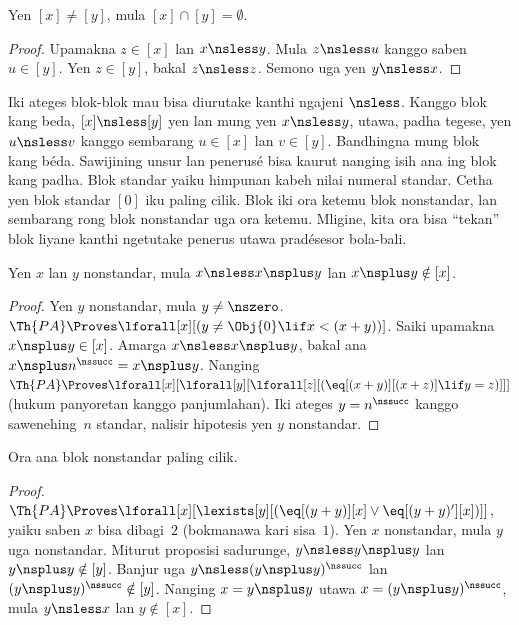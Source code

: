 \documentclass[../../../include/open-logic-section]{subfiles}
\begin{document}
\begin{cor}
Yen $[x] \neq [y]$,
mula $[x] \cap [y] =
\emptyset$.
\end{cor}

\begin{proof}
Upamakna $z \in [x]$
lan $x \nsless y$.
Mula $z \nsless u$
kanggo saben $u \in [y]$.
Yen $z \in [y]$,
bakal $z \nsless z$.
Semono uga yen
$y \nsless x$.
\end{proof}

\begin{explain}
Iki ateges blok-blok mau
bisa diurutake kanthi
ngajeni $\nsless$. Kanggo blok kang beda,
$[x] \nsless [y]$
yen lan mung yen
$x \nsless y$,
utawa, padha tegese,
yen $u \nsless v$
kanggo sembarang
$u \in [x]$
lan $v \in [y]$.
Bandhingna mung blok kang béda. Sawijining unsur lan penerusé bisa kaurut nanging isih ana ing blok kang padha. Blok standar yaiku himpunan kabeh nilai numeral standar.
Cetha yen blok standar
$[0]$ iku paling cilik.
Blok iki ora ketemu
blok nonstandar,
lan sembarang rong blok
nonstandar uga ora ketemu.
Mligine, kita ora bisa
“tekan” blok liyane
kanthi ngetutake penerus
utawa pradésesor bola-bali.
\end{explain}

\begin{prop}
Yen $x$ lan $y$
nonstandar, mula
$x \nsless x \nsplus y$
lan $x
\nsplus y \notin [x]$.
\end{prop}

\begin{proof}
Yen $y$ nonstandar,
mula $y \neq \nszero$.
$\Th{PA} \Proves
\lforall[x][(y \neq \Obj{0} \lif x < (x+y))]$.
Saiki upamakna $x
\nsplus y \in [x]$.
Amarga
$x \nsless x \nsplus y$,
bakal ana
$x \nsplus
n^\nssucc = x \nsplus y$.
Nanging $\Th{PA} \Proves
\lforall[x][\lforall[y][\lforall[z][(\eq[(x+y)][(x+z)] \lif y = z)]]]$
(hukum panyoretan
kanggo panjumlahan).
Iki ateges
$y = n^\nssucc$
kanggo sawenehing~$n$
standar, nalisir
hipotesis yen $y$
nonstandar.
\end{proof}

\begin{prop}
Ora ana blok nonstandar
paling cilik.
\end{prop}

\begin{proof}
$\Th{PA} \Proves \lforall[x][\lexists[y][(\eq[(y+y)][x] \lor
      \eq[(y+y)'][x])]]$,
yaiku saben $x$
bisa dibagi~$2$
(bokmanawa kari sisa~$1$).
Yen $x$ nonstandar,
mula $y$ uga nonstandar.
Miturut proposisi sadurunge,
$y \nsless y \nsplus y$
lan $y \nsplus y
\notin [y]$.
Banjur uga
$y \nsless (y \nsplus y)^\nssucc$
lan $(y
\nsplus y)^\nssucc \notin [y]$.
Nanging
$x = y \nsplus y$
utawa
$x = (y
\nsplus y)^\nssucc$,
mula $y \nsless x$
lan $y \notin [x]$.
\end{proof}
\end{document}
